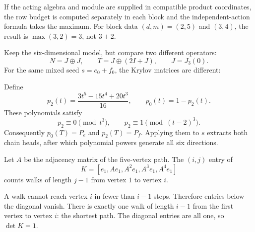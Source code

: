 If the acting algebra and module are supplied in compatible product coordinates, the row budget is computed separately in each block and the independent-action formula takes the maximum. For block data $(d,m)=(2,5)$ and $(3,4)$, the result is $\max(3,2)=3$, not $3+2$.


Keep the six-dimensional model, but compare two different operators:
\[
N=J\oplus J,\qquad T=J\oplus(2I+J),\qquad J=J_3(0).
\]
For the same mixed seed $s=e_0+f_0$, the Krylov matrices are different:


Define
\[
p_2(t)=\frac{3t^5-15t^4+20t^3}{16},\qquad p_0(t)=1-p_2(t).
\]
These polynomials satisfy
\[
p_2\equiv0\pmod{t^3},\qquad p_2\equiv1\pmod{(t-2)^3}.
\]
Consequently $p_0(T)=P_e$ and $p_2(T)=P_f$. Applying them to $s$ extracts both chain heads, after which polynomial powers generate all six directions.


Let $A$ be the adjacency matrix of the five-vertex path. The $(i,j)$ entry of
\[
K=[e_1,Ae_1,A^2e_1,A^3e_1,A^4e_1]
\]
counts walks of length $j-1$ from vertex $1$ to vertex $i$.


A walk cannot reach vertex $i$ in fewer than $i-1$ steps. Therefore entries below the diagonal vanish. There is exactly one walk of length $i-1$ from the first vertex to vertex $i$: the shortest path. The diagonal entries are all one, so $\det K=1$.


